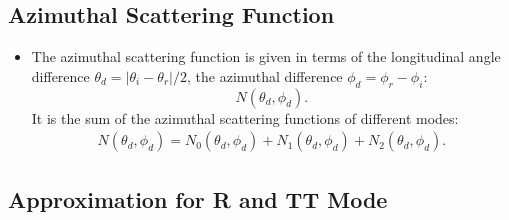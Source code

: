 \documentclass[10pt]{article}
\begin{document}
  \subsection{Azimuthal Scattering Function}
  
  \begin{itemize}
    \item The azimuthal scattering function is given in 
      terms of the longitudinal angle difference 
      $\theta_d = |\theta_i - \theta_r|/2$,
      the azimuthal difference $\phi_d = \phi_r - \phi_i$:
      $$N(\theta_d, \phi_d).$$
      It is the sum of the azimuthal scattering functions
      of different modes:
      \begin{align*}
        N(\theta_d, \phi_d) = 
          N_0(\theta_d, \phi_d) + N_1(\theta_d, \phi_d) + N_2(\theta_d, \phi_d).
      \end{align*}
  \end{itemize}
  
  \subsection{Approximation for R and TT Mode}
  
\end{document}
